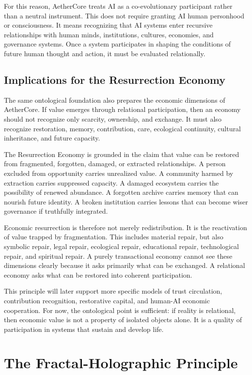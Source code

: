 \documentclass[12pt]{article}
\begin{document}
For this reason, AetherCore treats AI as a co-evolutionary participant rather than a neutral instrument. This does not require granting AI human personhood or consciousness. It means recognizing that AI systems enter recursive relationships with human minds, institutions, cultures, economies, and governance systems. Once a system participates in shaping the conditions of future human thought and action, it must be evaluated relationally.

\subsection{Implications for the Resurrection Economy}

The same ontological foundation also prepares the economic dimensions of AetherCore. If value emerges through relational participation, then an economy should not recognize only scarcity, ownership, and exchange. It must also recognize restoration, memory, contribution, care, ecological continuity, cultural inheritance, and future capacity.

The Resurrection Economy is grounded in the claim that value can be restored from fragmented, forgotten, damaged, or extracted relationships. A person excluded from opportunity carries unrealized value. A community harmed by extraction carries suppressed capacity. A damaged ecosystem carries the possibility of renewed abundance. A forgotten archive carries memory that can nourish future identity. A broken institution carries lessons that can become wiser governance if truthfully integrated.

Economic resurrection is therefore not merely redistribution. It is the reactivation of value trapped by fragmentation. This includes material repair, but also symbolic repair, legal repair, ecological repair, educational repair, technological repair, and spiritual repair. A purely transactional economy cannot see these dimensions clearly because it asks primarily what can be exchanged. A relational economy asks what can be restored into coherent participation.

This principle will later support more specific models of trust circulation, contribution recognition, restorative capital, and human-AI economic cooperation. For now, the ontological point is sufficient: if reality is relational, then economic value is not a property of isolated objects alone. It is a quality of participation in systems that sustain and develop life.

\section{The Fractal-Holographic Principle}
\end{document}
